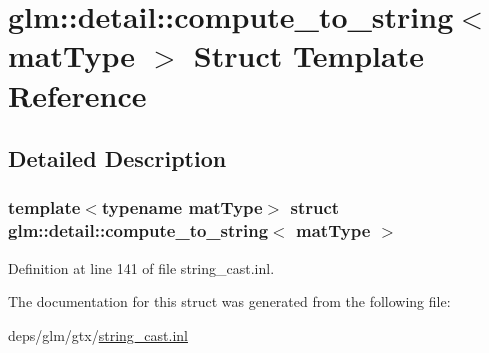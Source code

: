 \hypertarget{structglm_1_1detail_1_1compute__to__string}{}\section{glm\+:\+:detail\+:\+:compute\+\_\+to\+\_\+string$<$ mat\+Type $>$ Struct Template Reference}
\label{structglm_1_1detail_1_1compute__to__string}


\subsection{Detailed Description}
\subsubsection*{template$<$typename mat\+Type$>$\newline
struct glm\+::detail\+::compute\+\_\+to\+\_\+string$<$ mat\+Type $>$}



Definition at line 141 of file string\+\_\+cast.\+inl.



The documentation for this struct was generated from the following file\+:\begin{DoxyCompactItemize}
\item 
deps/glm/gtx/\hyperlink{string__cast_8inl}{string\+\_\+cast.\+inl}\end{DoxyCompactItemize}
